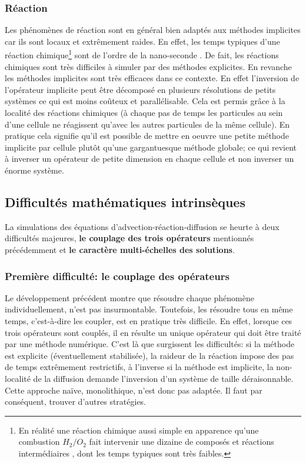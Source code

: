\subsubsection{Réaction}
    Les phénomènes de réaction sont en général bien adaptés aux méthodes implicites car ils sont locaux et extrêmement raides.
    En effet, les temps typiques d'une réaction chimique\footnote{
    En réalité une réaction chimique aussi simple en apparence qu'une combustion $H_2/O_2$ fait intervenir une dizaine de composés et réactions intermédiaires \cite{OConaire2004}, dont les temps typiques sont très faibles.} sont de l'ordre de la nano-seconde \cite{Wartha2021}.
    De fait, les réactions chimiques sont très difficiles à simuler par des méthodes explicites.
    En revanche les méthodes implicites sont très efficaces dans ce contexte. En effet l'inversion de l'opérateur implicite 
    peut être décomposé en plusieurs résolutions de petits systèmes ce qui est moins coûteux et parallélisable. Cela est permis grâce à la localité des réactions chimiques
    (à chaque pas de temps les particules au sein d'une cellule ne réagissent qu'avec les autres particules de la même cellule).
    En pratique cela signifie qu'il est possible de mettre en oeuvre une petite méthode implicite par cellule plutôt qu'une gargantuesque méthode globale; 
    ce qui revient à inverser un opérateur de petite dimension en chaque cellule et non inverser un énorme système.

\subsection{Difficultés mathématiques intrinsèques}\label{par:adr_difficile}
    La simulations des équations d'advection-réaction-diffusion se heurte à deux difficultés majeures, \textbf{le couplage des trois opérateurs} mentionnés précédemment
    et \textbf{le caractère multi-échelles des solutions}.

    \subsubsection{Première difficulté: le couplage des opérateurs}
        Le développement précédent montre que résoudre chaque phénomène individuellement, n'est pas insurmontable. 
        Toutefois, les résoudre tous en même temps, c'est-à-dire les coupler, est en pratique très difficile.
        En effet, lorsque ces trois opérateurs sont couplés, il en résulte un unique opérateur qui doit être traité par une méthode numérique.
        C'est là que surgissent les difficultés: si la méthode est explicite (éventuellement stabilisée), la raideur de la réaction impose des pas de temps extrêmement restrictifs,
        à l'inverse si la méthode est implicite, la non-localité de la diffusion demande l'inversion d'un système de taille déraisonnable. 
        Cette approche naïve, monolithique, n'est donc pas adaptée. Il faut par conséquent, trouver d'autres stratégies.

